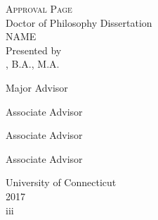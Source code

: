 \documentclass{article}
\begin{document}
\thispagestyle{empty}
{\center \textsc{Approval Page}\\ 
\vspace{1cm}
Doctor of Philosophy Dissertation\\
\vspace{1cm}
NAME\\ %
\vspace{3cm}
Presented by \\ 
, B.A., M.A.\\ %

}


\vspace{2cm}
Major Advisor \underline{\hspace{5.2in}}
{\center 

}
\vspace{1.5cm}
Associate Advisor \underline{\hspace{5in}}

{ \center 
 
} 
\vspace{1.5cm}

Associate Advisor \underline{\hspace{5in}}

{ \center
} 
\vspace{1.5cm}
Associate Advisor \underline{\hspace{5in}}

{ \center 
} 

\vfill 
{\center University of Connecticut\\ 
2017\\
iii

}
\end{document}
